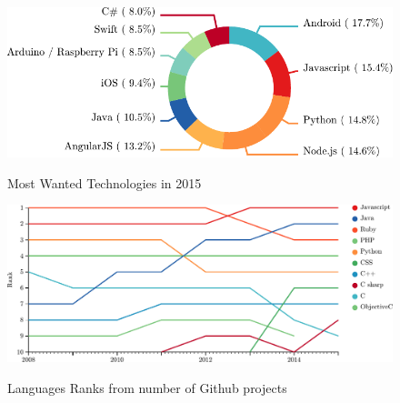 \begin{figure}
  \centering
  \includegraphics[width=0.7\linewidth]{../resources/stackoverflow-mostwanted.pdf}
  \label{fig:so-tags}
  \caption{Most Wanted Technologies in 2015}
\end{figure}




\begin{figure}
  \centering
  \includegraphics[width=\linewidth]{../resources/github-languages.pdf}
  \label{fig:github-languages}
  \caption{Languages Ranks from number of Github projects}
\end{figure}

